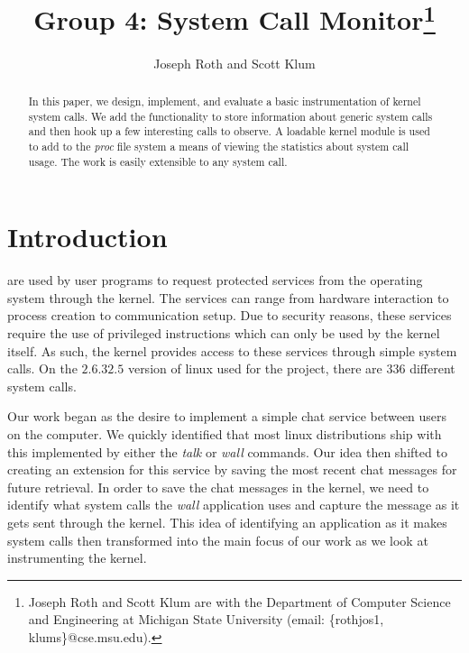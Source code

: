 \documentclass[conference]{IEEEtran}
\begin{document}
\title{\ \\ \LARGE\bf Group 4: System Call Monitor\thanks{Joseph Roth and Scott Klum are with the Department of Computer Science and Engineering at Michigan State University (email: \{rothjos1, klums\}@cse.msu.edu).}}

\author{Joseph Roth and Scott Klum}


\maketitle

\begin{abstract}
In this paper, we design, implement, and evaluate a basic instrumentation of kernel system calls.
We add the functionality to store information about generic system calls and then hook up a few interesting calls to observe.
A loadable kernel module is used to add to the \textit{proc} file system a means of viewing the statistics about system call usage.
The work is easily extensible to any system call.
\end{abstract}


\section{Introduction}

 are used by user programs to request protected services from the operating system through the kernel.
The services can range from hardware interaction to process creation to communication setup.
Due to security reasons, these services require the use of privileged instructions which can only be used by the kernel itself.
As such, the kernel provides access to these services through simple system calls.
On the $2.6.32.5$ version of linux used for the project, there are $336$ different system calls.

Our work began as the desire to implement a simple chat service between users on the computer.
We quickly identified that most linux distributions ship with this implemented by either the \textit{talk} or \textit{wall} commands.
Our idea then shifted to creating an extension for this service by saving the most recent chat messages for future retrieval.
In order to save the chat messages in the kernel, we need to identify what system calls the \textit{wall} application uses and capture the message as it gets sent through the kernel.
This idea of identifying an application as it makes system calls then transformed into the main focus of our work as we look at instrumenting the kernel.
\end{document}
